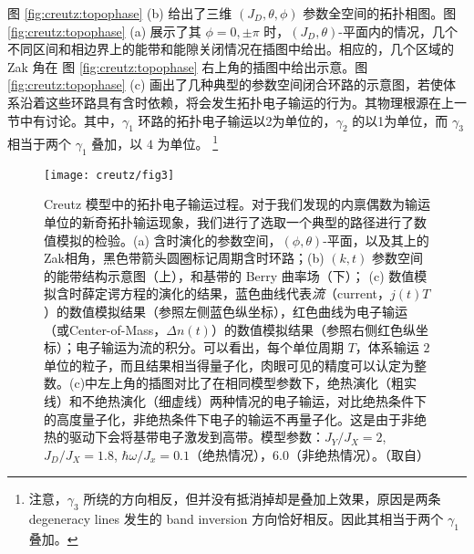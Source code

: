 图 \ref{fig:creutz:topophase} (b) 给出了三维 $(J_D, \theta, \phi)$ 参数全空间的拓扑相图。图 \ref{fig:creutz:topophase} (a) 展示了其 $\phi=0,\pm\pi$ 时，$(J_D, \theta)$-平面内的情况，几个不同区间和相边界上的能带和能隙关闭情况在插图中给出。相应的，几个区域的 Zak 角在 图 \ref{fig:creutz:topophase} 右上角的插图中给出示意。图 \ref{fig:creutz:topophase} (c) 画出了几种典型的参数空间闭合环路的示意图，若使体系沿着这些环路具有含时依赖，将会发生拓扑电子输运的行为。其物理根源在上一节中有讨论。其中，$\gamma_1$ 环路的拓扑电子输运以2为单位的，$\gamma_2$ 的以1为单位，而 $\gamma_3$ 相当于两个 $\gamma_1$ 叠加，以 $4$ 为单位。
\footnote{注意，$\gamma_3$ 所绕的方向相反，但并没有抵消掉却是叠加上效果，原因是两条 degeneracy lines 发生的 band inversion 方向恰好相反。因此其相当于两个 $\gamma_1$ 叠加。}


\begin{figure}[!htb]
\centering
\texttt{[image: creutz/fig3]}
\caption{Creutz 模型中的拓扑电子输运过程。对于我们发现的内禀偶数为输运单位的新奇拓扑输运现象，我们进行了选取一个典型的路径进行了数值模拟的检验。(a) 含时演化的参数空间，$(\phi, \theta)$-平面，以及其上的Zak相角，黑色带箭头圆圈标记周期含时环路；(b) $(k,t)$ 参数空间的能带结构示意图（上），和基带的 Berry 曲率场（下）； (c) 数值模拟含时薛定谔方程的演化的结果，蓝色曲线代表\textit{流}（current，$j(t)T$）的数值模拟结果（参照左侧蓝色纵坐标），红色曲线为电子输运（或Center-of-Mass，$\Delta n(t)$）的数值模拟结果（参照右侧红色纵坐标）；电子输运为流的积分。可以看出，每个单位周期 $T$，体系输运 $2$ 单位的粒子，而且结果相当得量子化，肉眼可见的精度可以认定为整数。(c)中左上角的插图对比了在相同模型参数下，绝热演化（粗实线）和不绝热演化（细虚线）两种情况的电子输运，对比绝热条件下的高度量子化，非绝热条件下电子的输运不再量子化。这是由于非绝热的驱动下会将基带电子激发到高带。模型参数：$J_Y/J_X=2$, $J_D/J_X=1.8$, $\hbar\omega/J_x=0.1$（绝热情况），$6.0$（非绝热情况）。（取自）}
\label{fig:creutz:chargepumps}
\end{figure}

